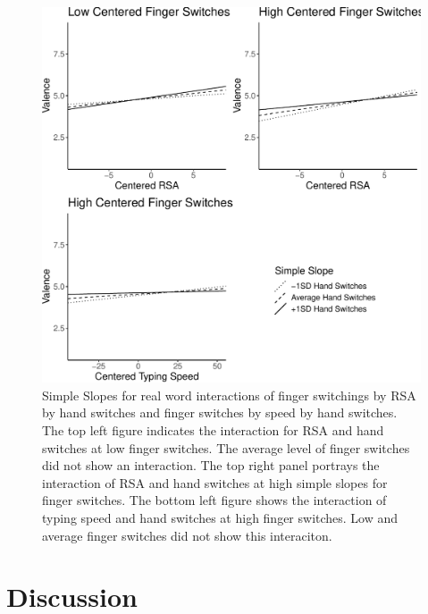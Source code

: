 \documentclass[
  english,
  man]{apa7}
\begin{document}
\begin{figure}
\centering
\includegraphics{QWERTY_files/figure-latex/graphs2-1.pdf}
\caption{\label{fig:graphs2}Simple Slopes for real word interactions of finger switchings by RSA by hand switches and finger switches by speed by hand switches. The top left figure indicates the interaction for RSA and hand switches at low finger switches. The average level of finger switches did not show an interaction. The top right panel portrays the interaction of RSA and hand switches at high simple slopes for finger switches. The bottom left figure shows the interaction of typing speed and hand switches at high finger switches. Low and average finger switches did not show this interaciton.}
\end{figure}

\hypertarget{discussion}{%
\section{Discussion}\label{discussion}}
\end{document}
